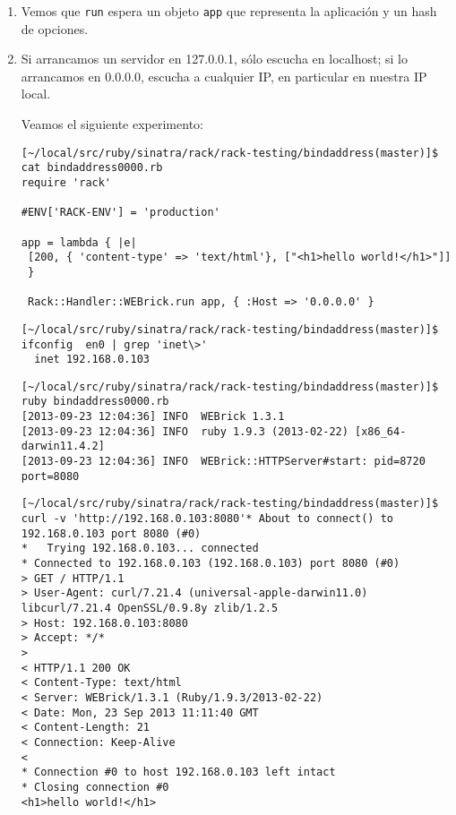 \begin{enumerate}
\item 
Vemos que \verb|run| espera un objeto \verb|app| que representa la
aplicación y un hash de opciones.
\item 
Si arrancamos un servidor en 127.0.0.1, sólo escucha en
localhost; 
si lo arrancamos en 0.0.0.0, 
escucha a cualquier IP, en particular en nuestra IP local.

Veamos el siguiente experimento:

\begin{verbatim}
[~/local/src/ruby/sinatra/rack/rack-testing/bindaddress(master)]$ cat bindaddress0000.rb 
require 'rack'

#ENV['RACK-ENV'] = 'production'

app = lambda { |e| 
 [200, { 'content-type' => 'text/html'}, ["<h1>hello world!</h1>"]]
 }

 Rack::Handler::WEBrick.run app, { :Host => '0.0.0.0' }
\end{verbatim}

\begin{verbatim}
[~/local/src/ruby/sinatra/rack/rack-testing/bindaddress(master)]$ ifconfig  en0 | grep 'inet\>'
  inet 192.168.0.103 
\end{verbatim}

\begin{verbatim}
[~/local/src/ruby/sinatra/rack/rack-testing/bindaddress(master)]$ ruby bindaddress0000.rb 
[2013-09-23 12:04:36] INFO  WEBrick 1.3.1
[2013-09-23 12:04:36] INFO  ruby 1.9.3 (2013-02-22) [x86_64-darwin11.4.2]
[2013-09-23 12:04:36] INFO  WEBrick::HTTPServer#start: pid=8720 port=8080
\end{verbatim}

\begin{verbatim}
[~/local/src/ruby/sinatra/rack/rack-testing/bindaddress(master)]$ curl -v 'http://192.168.0.103:8080'* About to connect() to 192.168.0.103 port 8080 (#0)
*   Trying 192.168.0.103... connected
* Connected to 192.168.0.103 (192.168.0.103) port 8080 (#0)
> GET / HTTP/1.1
> User-Agent: curl/7.21.4 (universal-apple-darwin11.0) libcurl/7.21.4 OpenSSL/0.9.8y zlib/1.2.5
> Host: 192.168.0.103:8080
> Accept: */*
> 
< HTTP/1.1 200 OK 
< Content-Type: text/html
< Server: WEBrick/1.3.1 (Ruby/1.9.3/2013-02-22)
< Date: Mon, 23 Sep 2013 11:11:40 GMT
< Content-Length: 21
< Connection: Keep-Alive
< 
* Connection #0 to host 192.168.0.103 left intact
* Closing connection #0
<h1>hello world!</h1>
\end{verbatim}


\end{enumerate}
